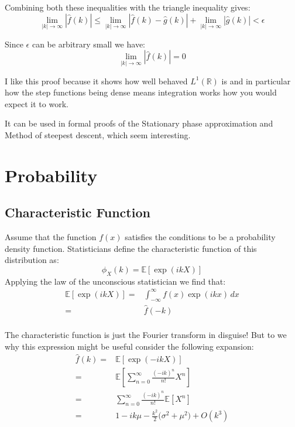 \documentclass[12pt]{report}
\begin{document}
Combining both these inequalities with the triangle inequality gives:
\[\lim_{|k|\rightarrow \infty}|\hat{f}(k)| \leq \lim_{|k|\rightarrow \infty}|\hat{f}(k)-\hat{g}(k)| + \lim_{|k|\rightarrow \infty}|\hat{g}(k)| < \epsilon\]

Since $\epsilon$ can be arbitrary small we have:
\[\lim_{|k|\rightarrow \infty}|\hat{f}(k)| = 0\]

I like this proof because it shows how well behaved $L^1(\mathbb{R})$ is and in particular how the step functions being dense means integration works how you would expect it to work.

It can be used in formal proofs of the Stationary phase approximation and Method of steepest descent, which seem interesting.

\section{Probability}
\subsection{Characteristic Function}

Assume that the function $f(x)$ satisfies the conditions to be a probability density function.
Statisticians define the characteristic function of this distribution as:
\[\phi_X(k) = \mathbb{E}[\exp(ikX)]\]
Applying the law of the unconscious statistician we find that:
\begin{equation*}
\begin{aligned}
\mathbb{E}[\exp(ikX)] =& \int_{-\infty}^{\infty}f(x)\exp(ikx)\,dx\\
=& \hat{f}(-k)\\
\end{aligned}
\end{equation*}

The characteristic function is just the Fourier transform in disguise!
But to we why this expression might be useful consider the following expansion:
\begin{equation*}
\begin{aligned}
\hat{f}(k) =& \mathbb{E}[\exp(-ikX)]\\
=& \mathbb{E}\left[\sum_{n=0}^\infty\frac{(-ik)^n}{n!}X^n\right]\\
=& \sum_{n=0}^\infty\frac{(-ik)^n}{n!}\mathbb{E}\left[X^n\right]\\
=&1-ik\mu-\frac{k^2}{2}\big(\sigma^2+\mu^2\big) + O(k^3)\\
\end{aligned}
\end{equation*}
\end{document}
